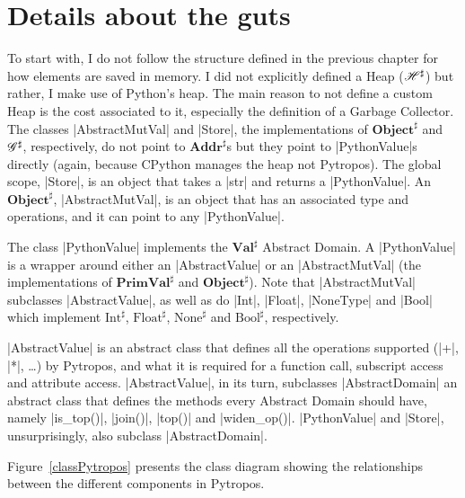 \section{Details about the guts}

To start with, I do not follow the structure defined in the previous chapter for how
elements are saved in memory. I did not explicitly defined a Heap (\(\mathscr{H}^\sharp\)) but
rather, I make use of Python's heap. The main reason to not define a custom Heap is the
cost associated to it, especially the definition of a Garbage Collector. The classes
\pycode|AbstractMutVal| and \pycode|Store|, the implementations of
\(\mathbf{Object}^\sharp\) and \(\mathscr{G}^\sharp\), respectively, do not point to
\(\mathbf{Addr}^\sharp\)s but they point to \pycode|PythonValue|s directly (again, because
CPython manages the heap not Pytropos). The global scope, \pycode|Store|, is an object
that takes a \pycode|str| and returns a \pycode|PythonValue|. An
\(\mathbf{Object}^\sharp\), \pycode|AbstractMutVal|, is an object that has an associated
type and operations, and it can point to any \pycode|PythonValue|.

The class \pycode|PythonValue| implements the \(\mathbf{Val}^\sharp\) Abstract Domain. A
\pycode|PythonValue| is a wrapper around either an \pycode|AbstractValue| or an
\pycode|AbstractMutVal| (the implementations of \(\mathbf{PrimVal}^\sharp\) and
\(\mathbf{Object}^\sharp\)). Note that \pycode|AbstractMutVal| subclasses
\pycode|AbstractValue|, as well as do \pycode|Int|, \pycode|Float|, \pycode|NoneType| and
\pycode|Bool| which implement \(\text{Int}^\sharp\), \(\text{Float}^\sharp\),
\(\text{None}^\sharp\) and \(\text{Bool}^\sharp\), respectively.

\pycode|AbstractValue| is an abstract class that defines all the
operations supported (\pycode|+|, \pycode|*|, \ldots{}) by Pytropos, and
what it is required for a function call, subscript access and attribute
access. \pycode|AbstractValue|, in its turn, subclasses
\pycode|AbstractDomain| an abstract class that defines the methods every
Abstract Domain should have, namely \pycode|is_top()|, \pycode|join()|,
\pycode|top()| and \pycode|widen_op()|. \pycode|PythonValue| and
\pycode|Store|, unsurprisingly, also subclass \pycode|AbstractDomain|.

Figure~\ref{classPytropos} presents the class diagram showing the relationships
between the different components in Pytropos.

